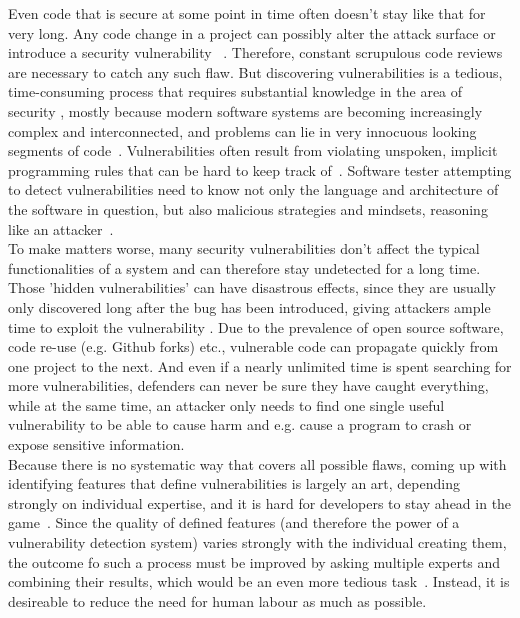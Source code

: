 \documentclass[
	a4paper,
	pagesize,
	pdftex,
	12pt,
	twoside, %
	BCOR=5mm, %
	ngerman,
	fleqn,
	final,
	]{scrartcl}
\begin{document}
Even code that is secure at some point in time often doesn't stay like that for very long. Any code change in a project can possibly alter the attack surface or introduce a security vulnerability ~\cite{Morrison.2015}. Therefore, constant scrupulous code reviews are necessary to catch any such flaw. But discovering vulnerabilities is a tedious, time-consuming process that requires substantial knowledge in the area of security \cite{Yamaguchi.2011}, mostly because modern software systems are becoming increasingly complex and interconnected, and problems can lie in very innocuous looking segments of code~\cite{Pang.2015, Li.2018}. Vulnerabilities often result from violating unspoken, implicit programming rules that can be hard to keep track of~\cite{Li.2005}. Software tester attempting to detect vulnerabilities need to know not only the language and architecture of the software in question, but also malicious strategies and mindsets, reasoning like an attacker~\cite{Pang.2015}.\\
To make matters worse, many security vulnerabilities don't affect the typical functionalities of a system 
and can therefore stay undetected for a long time. Those 'hidden vulnerabilities' can have disastrous effects, since they are usually only discovered long after the bug has been introduced, giving attackers ample time to exploit the vulnerability \cite{Wijayasekara.2012,Ma.2017,Russell.2018}. Due to the prevalence of open source software, code re-use (e.g. Github forks) etc., vulnerable code can propagate quickly from one project to the next. And even if a nearly unlimited time is spent searching for more vulnerabilities, defenders can never be sure they have caught everything, while at the same time, an attacker only needs to find one single useful vulnerability to be able to cause harm and e.g. cause a program to crash or expose sensitive information.\\
Because there is no systematic way that covers all possible flaws, coming up with identifying features that define vulnerabilities is largely an art, depending strongly on individual expertise, and it is hard for developers to stay ahead in the game~\cite{Rolim.2018,Li.2018}. Since the quality of defined features (and therefore the power of a vulnerability detection system) varies strongly with the individual creating them, the outcome fo such a process must be improved by asking multiple experts and combining their results, which would be an even more tedious task~\cite{Li.2018}. Instead, it is desireable to reduce the need for human labour as much as possible.\\
\end{document}
